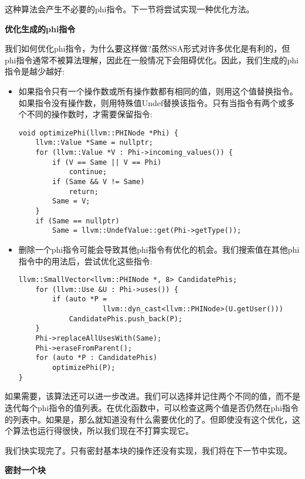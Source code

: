 这种算法会产生不必要的phi指令。下一节将尝试实现一种优化方法。\par

\hspace*{\fill} \par %
\textbf{优化生成的phi指令}

我们如何优化phi指令，为什么要这样做?虽然SSA形式对许多优化是有利的，但phi指令通常不被算法理解，因此在一般情况下会阻碍优化。因此，我们生成的phi指令是越少越好:\par

\begin{itemize}
\item 如果指令只有一个操作数或所有操作数都有相同的值，则用这个值替换指令。如果指令没有操作数，则用特殊值Undef替换该指令。只有当指令有两个或多个不同的操作数时，才需要保留指令:
\begin{lstlisting}[caption={}]
void optimizePhi(llvm::PHINode *Phi) {
	llvm::Value *Same = nullptr;
	for (llvm::Value *V : Phi->incoming_values()) {
		if (V == Same || V == Phi)
			continue;
		if (Same && V != Same)
			return;
		Same = V;
	}
	if (Same == nullptr)
		Same = llvm::UndefValue::get(Phi->getType());
\end{lstlisting}

\item 删除一个phi指令可能会导致其他phi指令有优化的机会。我们搜索值在其他phi指令中的用法后，尝试优化这些指令:
\begin{lstlisting}[caption={}]
	llvm::SmallVector<llvm::PHINode *, 8> CandidatePhis;
	for (llvm::Use &U : Phi->uses()) {
		if (auto *P =
					llvm::dyn_cast<llvm::PHINode>(U.getUser()))
			CandidatePhis.push_back(P);
	}
	Phi->replaceAllUsesWith(Same);
	Phi->eraseFromParent();
	for (auto *P : CandidatePhis)
		optimizePhi(P);
}
\end{lstlisting}

\end{itemize}

如果需要，该算法还可以进一步改进。我们可以选择并记住两个不同的值，而不是迭代每个phi指令的值列表。在优化函数中，可以检查这两个值是否仍然在phi指令的列表中。如果是，那么就知道没有什么需要优化的了。但即使没有这个优化，这个算法也运行得很快，所以我们现在不打算实现它。\par

我们快实现完了。只有密封基本块的操作还没有实现，我们将在下一节中实现。\par

\hspace*{\fill} \par %
\textbf{密封一个块}

